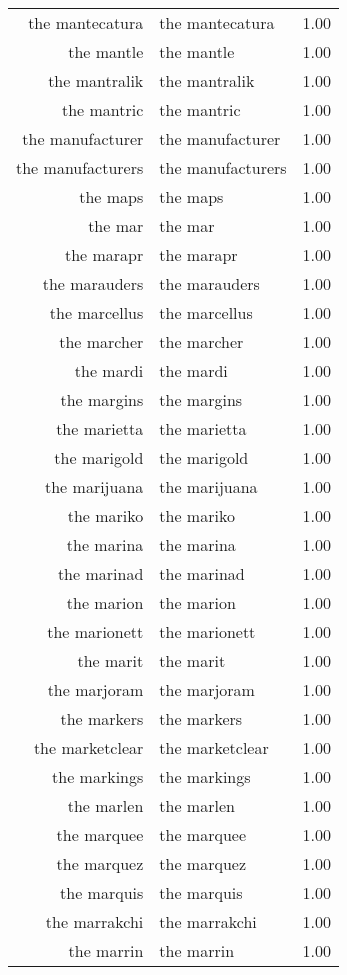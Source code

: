 \begin{table}[ht]
\begin{tabular}{rlr}
  the mantecatura & the mantecatura & 1.00 \\ 
  the mantle & the mantle & 1.00 \\ 
  the mantralik & the mantralik & 1.00 \\ 
  the mantric & the mantric & 1.00 \\ 
  the manufacturer & the manufacturer & 1.00 \\ 
  the manufacturers & the manufacturers & 1.00 \\ 
  the maps & the maps & 1.00 \\ 
  the mar & the mar & 1.00 \\ 
  the marapr & the marapr & 1.00 \\ 
  the marauders & the marauders & 1.00 \\ 
  the marcellus & the marcellus & 1.00 \\ 
  the marcher & the marcher & 1.00 \\ 
  the mardi & the mardi & 1.00 \\ 
  the margins & the margins & 1.00 \\ 
  the marietta & the marietta & 1.00 \\ 
  the marigold & the marigold & 1.00 \\ 
  the marijuana & the marijuana & 1.00 \\ 
  the mariko & the mariko & 1.00 \\ 
  the marina & the marina & 1.00 \\ 
  the marinad & the marinad & 1.00 \\ 
  the marion & the marion & 1.00 \\ 
  the marionett & the marionett & 1.00 \\ 
  the marit & the marit & 1.00 \\ 
  the marjoram & the marjoram & 1.00 \\ 
  the markers & the markers & 1.00 \\ 
  the marketclear & the marketclear & 1.00 \\ 
  the markings & the markings & 1.00 \\ 
  the marlen & the marlen & 1.00 \\ 
  the marquee & the marquee & 1.00 \\ 
  the marquez & the marquez & 1.00 \\ 
  the marquis & the marquis & 1.00 \\ 
  the marrakchi & the marrakchi & 1.00 \\ 
  the marrin & the marrin & 1.00 \\ 

\end{tabular}
\end{table}
